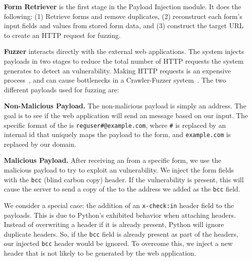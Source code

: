 \textbf{\Email Form Retriever} is the first stage in the Payload Injection
module. It does the following: (1) Retrieve forms and
remove duplicates, (2) reconstruct
each form's input fields and values from stored form data, and (3) construct the target URL
to create an HTTP request for fuzzing.

\textbf{Fuzzer}
interacts directly with the external web applications. The system
injects payloads in two stages to reduce the total number of HTTP requests the system generates to detect an \ehi vulnerability. Making HTTP requests is an expensive process~\cite{httpperf}, and can cause bottlenecks in a Crawler-Fuzzer system~\cite{ShkapenyukTorstenSuel2001}.
The two different payloads used for fuzzing are:

\noindent\textbf{Non-Malicious Payload.}
The non-malicious payload is simply an \email address. The goal is to see if the web application will send an \email message based on our input. The specific format of the \email is \lstinline|reguser#@example.com|, where \texttt{\#} is replaced by an internal id that uniquely maps the payload to the form, and \texttt{example.com} is replaced by our domain.

\noindent\textbf{Malicious Payload.}
After receiving an \email from a specific form, we use the malicious payload to try to exploit an \ehi vulnerability. We inject the form fields with the \texttt{bcc} (blind carbon copy) header. If the vulnerability is present, this will cause the server to send a copy of the \email to the \email address we added as the \texttt{bcc} field.

We consider a special case: the addition of an \texttt{x-check:in} header field to the payloads. This is due to Python's exhibited behavior when attaching
headers. Instead of overwriting a header if it is already present, Python will ignore duplicate headers. So, if the \texttt{bcc} field is already present as part of the headers, our injected \texttt{bcc} header would be ignored. To overcome this, we inject a new header that is not likely to be generated by the web application. 


